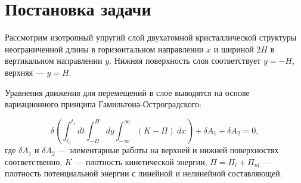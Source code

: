 
\section{Постановка задачи}


Рассмотрим изотропный упругий слой двухатомной кристаллической структуры неограниченной длины в горизонтальном направлении $x$ и шириной $2 H$ в вертикальном направлении $y$. Нижняя поверхность слоя соответствует $y = -H$, верхняя --- $y = H$.



Уравнения движения для перемещений в слое выводятся на основе вариационного принципа Гамильтона-Остроградского:

\begin{equation}
	\delta \left( \int_{t_0}^{t_1}dt \int_{-H}^{H} dy \int_{-\infty}^{\infty}\left( K - \Pi \right)  \:   dx \right)+ \delta A_1 + \delta A_2=0, \label{var}
\end{equation}
где $\delta A_1$ и $\delta A_2$ --- элементарные работы на верхней и нижней поверхностях соответственно, $K$ --- плотность кинетической энергии, $\Pi = \Pi_{l} + \Pi_{nl}$ --- плотность потенциальной энергии с линейной и нелинейной составляющей.

